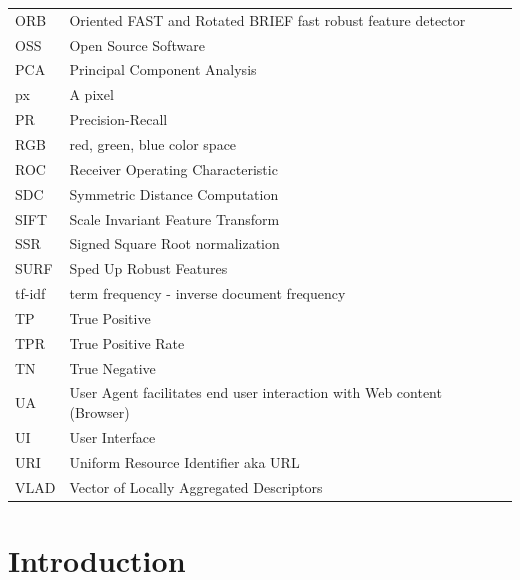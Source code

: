 \documentclass[english,12pt,a4paper,pdftex,elec,utf8]{aaltothesis}
\begin{document}
\begin{tabular}{ll}
  ORB & Oriented FAST and Rotated BRIEF fast robust feature detector\\
  OSS & Open Source Software\\
  PCA & Principal Component Analysis\\
  px & A pixel  \\
  PR & Precision-Recall\\
  RGB & red, green, blue color space\\
  ROC & Receiver Operating Characteristic\\
  SDC & Symmetric Distance Computation\\
  SIFT & Scale Invariant Feature Transform \\
  SSR & Signed Square Root normalization\\
  SURF & Sped Up Robust Features \\
  tf-idf & term frequency - inverse document frequency\\
  TP & True Positive\\
  TPR & True Positive Rate\\
  TN & True Negative\\
  UA   & User Agent facilitates end user interaction with Web content (Browser)\\
  UI   & User Interface\\
  URI  & Uniform Resource Identifier aka URL\\
  VLAD & Vector of Locally Aggregated Descriptors\\
\end{tabular}

\cleardoublepage
\storeinipagenumber
{}
\setcounter{page}{1}


\section{Introduction}
\end{document}

